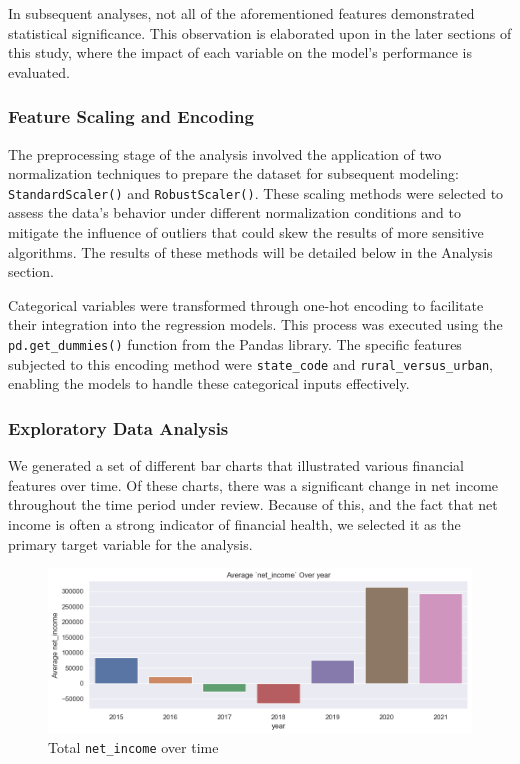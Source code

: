 \documentclass{article}
\theoremstyle{mytheoremstyle}
\theoremstyle{mytheoremstyle}
\theoremstyle{myproblemstyle}
\begin{document}
In subsequent analyses, not all of the aforementioned features demonstrated statistical significance. This observation is elaborated upon in the later sections of this study, where the impact of each variable on the model's performance is evaluated.

\subsubsection{Feature Scaling and Encoding}
The preprocessing stage of the analysis involved the application of two normalization techniques to prepare the dataset for subsequent modeling: \texttt{StandardScaler()} and \texttt{RobustScaler()}. These scaling methods were selected to assess the data’s behavior under different normalization conditions and to mitigate the influence of outliers that could skew the results of more sensitive algorithms. The results of these methods will be detailed below in the Analysis section. 

Categorical variables were transformed through one-hot encoding to facilitate their integration into the regression models. This process was executed using the \texttt{pd.get\_dummies()} function from the Pandas library. The specific features subjected to this encoding method were \texttt{state\_code} and \texttt{rural\_versus\_urban}, enabling the models to handle these categorical inputs effectively.


\subsubsection{Exploratory Data Analysis}
We generated a set of different bar charts that illustrated various financial features over time. Of these charts, there was a significant change in net income throughout the time period under review. Because of this, and the fact that net income is often a strong indicator of financial health, we selected it as the primary target variable for the analysis.

\pagebreak
\begin{figure}[htbp]
\centering
\includegraphics[width=\linewidth]{Images/netincome.png}
\caption{Total \texttt{net\_income} over time}
\label{fig:netincome EDA}
\end{figure}
\end{document}
